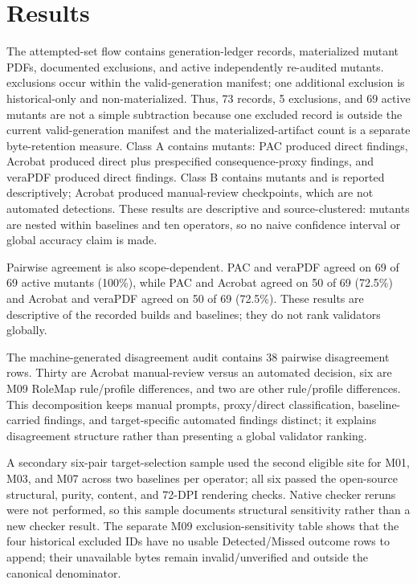 \documentclass[conference]{IEEEtran}
\newcommand{\taggedsection}[1]{%
  \tagstructbegin{tag=H1}\tagmcbegin{tag=H1}\section{#1}\tagmcend\tagstructend}
\newenvironment{taggedparagraph}{%
  \tagstructbegin{tag=P}\tagmcbegin{tag=P}%
}{%
  \tagmcend\tagstructend%
}
\begin{document}
\taggedsection{Results}


\begin{taggedparagraph}
The attempted-set flow contains \GenerationLedgerRecords{} generation-ledger records, \MaterializedMutantArtifacts{} materialized mutant PDFs, \HistoricalExclusions{} documented exclusions, and \ActiveReauditedMutants{} active independently re-audited mutants. \InManifestExclusions{} exclusions occur within the valid-generation manifest; one additional exclusion is historical-only and non-materialized. Thus, 73 records, 5 exclusions, and 69 active mutants are not a simple subtraction because one excluded record is outside the current valid-generation manifest and the materialized-artifact count is a separate byte-retention measure. Class A contains \ClassAMutants{} mutants: PAC produced \ClassAPACDirect{} direct findings, Acrobat produced \ClassAAcrobatDirect{} direct plus \ClassAAcrobatProxy{} prespecified consequence-proxy findings, and veraPDF produced \ClassAVeraDirect{} direct findings. Class B contains \ClassBMutants{} mutants and is reported descriptively; Acrobat produced \AcrobatManualRows{} manual-review checkpoints, which are not automated detections. These results are descriptive and source-clustered: \ActiveReauditedMutants{} mutants are nested within \ReferencePDFs{} baselines and ten operators, so no naive confidence interval or global accuracy claim is made.
\end{taggedparagraph}

\begin{taggedparagraph}
Pairwise agreement is also scope-dependent. PAC and veraPDF agreed on 69 of 69 active mutants (100\%), while PAC and Acrobat agreed on 50 of 69 (72.5\%) and Acrobat and veraPDF agreed on 50 of 69 (72.5\%). These results are descriptive of the recorded builds and baselines; they do not rank validators globally.
\end{taggedparagraph}
\begin{taggedparagraph}
The machine-generated disagreement audit contains 38 pairwise disagreement rows. Thirty are Acrobat manual-review versus an automated decision, six are M09 RoleMap rule/profile differences, and two are other rule/profile differences. This decomposition keeps manual prompts, proxy/direct classification, baseline-carried findings, and target-specific automated findings distinct; it explains disagreement structure rather than presenting a global validator ranking.
\end{taggedparagraph}
\begin{taggedparagraph}
A secondary six-pair target-selection sample used the second eligible site for M01, M03, and M07 across two baselines per operator; all six passed the open-source structural, purity, content, and 72-DPI rendering checks. Native checker reruns were not performed, so this sample documents structural sensitivity rather than a new checker result. The separate M09 exclusion-sensitivity table shows that the four historical excluded IDs have no usable Detected/Missed outcome rows to append; their unavailable bytes remain invalid/unverified and outside the canonical denominator.
\end{taggedparagraph}
\end{document}
